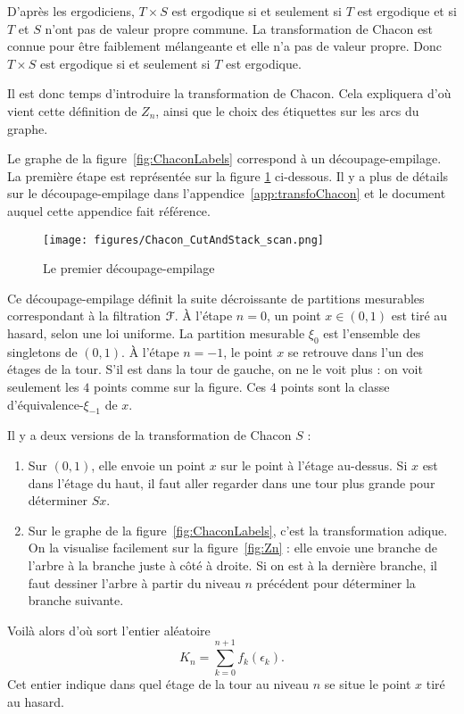 \documentclass[12pt,a4paper]{article}
\begin{document}
D'après les ergodiciens,  $T\times S$ est ergodique si et seulement si 
$T$ est ergodique et si $T$ et $S$ n'ont pas de valeur propre commune. 
La transformation de Chacon est connue pour être faiblement mélangeante 
et elle n'a pas de valeur propre. Donc $T\times S$ est ergodique si 
et seulement si $T$ est ergodique. 

{\scriptsize %
Il est donc temps d'introduire la transformation de Chacon. 
Cela expliquera d'où vient cette définition de $Z_n$, ainsi que le choix 
des étiquettes sur les arcs du graphe. 

Le graphe de la figure~\ref{fig:ChaconLabels} correspond à un découpage-empilage. 
La première étape est représentée sur la figure \ref{fig:scan} ci-dessous.
Il y a plus de détails sur le découpage-empilage dans l'appendice~\ref{app:transfoChacon} et 
le document auquel cette appendice fait référence.

\begin{figure}[!h]
\centering
	\texttt{[image: figures/Chacon\_CutAndStack\_scan.png]}
\caption{Le premier découpage-empilage}\label{fig:scan}
\end{figure}

Ce découpage-empilage définit la suite décroissante de partitions mesurables 
correspondant à la filtration $\EuScript{F}$. 
À l'étape $n=0$, un point $x \in (0,1)$ est tiré au hasard, selon une loi uniforme. 
La partition mesurable $\xi_0$ est l'ensemble des singletons de $(0,1)$. 
À l'étape $n=-1$, le point $x$ se retrouve dans l'un des étages de la tour. 
S'il est dans la tour de gauche, on ne le voit plus : on voit 
seulement les $4$ points comme sur la figure. Ces $4$ points sont la classe 
d'équivalence-$\xi_{-1}$ de $x$.  

Il y a deux versions de la transformation de Chacon $S$ :
\begin{enumerate}
\item Sur $(0,1)$, elle envoie un point $x$ sur le point à l'étage au-dessus. 
Si $x$ est dans l'étage du haut, il faut aller regarder dans une tour plus grande 
pour déterminer $Sx$. 

\item Sur le graphe de la  figure~\ref{fig:ChaconLabels}, c'est la transformation adique. 
On la visualise facilement sur la figure~\ref{fig:Zn} : elle envoie une branche 
de l'arbre à la branche juste à côté à droite. Si on est à la dernière branche, 
il faut dessiner l'arbre à partir du niveau $n$ précédent pour déterminer la 
branche suivante. 
\end{enumerate}

Voilà alors d'où sort l'entier aléatoire 
$$
K_n=\sum_{k=0}^{n+1}f_k(\epsilon_k).
$$
Cet entier indique dans quel étage de la tour au niveau $n$ se situe 
le point $x$ tiré au hasard. 
}
\end{document}
